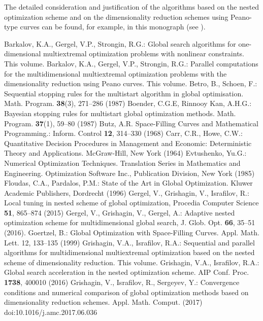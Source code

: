 The detailed consideration and justification of the algorithms based on the nested optimization scheme and on the dimensionality reduction schemes using Peano-type curves can be found, for example, in this monograph (see \cite{1_BarGerStrChap6, 1_GriIsrChap5}). 
% 
\begin{thebibliography}{99.}
 Barkalov, K.A., Gergel, V.P., Strongin, R.G.: Global search algorithms for one-dimensional multiextremal optimization problems with nonlinear constraints. This volume.
 Barkalov, K.A., Gergel, V.P., Strongin, R.G.: Parallel computations for the multidimensional multiextremal optimization problems with the dimensionality reduction using Peano curves. This volume.
 Betro, B., Schoen, F.: Sequential stopping rules for the multistart algorithm in global optimisation. Math. Program. \textbf{38}(3), 271--286 (1987)
	Boender, C.G.E, Rinnooy Kan, A.H.G.: Bayesian stopping rules for multistart global optimization methods. Math. Program. \textbf{37}(1), 59--80 (1987)
	Butz, A.R. Space-Filling Curves and Mathematical Programming.: Inform. Control \textbf{12}, 314--330 (1968)
	Carr, C.R., Howe, C.W.: Quantitative Decision Procedures in Management and Economic: Deterministic Theory and Applications. McGraw-Hill, New York (1964)
	Evtushenko, Yu.G.: Numerical Optimization Techniques. Translation Series in Mathematics and Engineering. Optimization Software  Inc., Publication Division, New York (1985)
 Floudas, C.A., Pardalos, P.M.: State of the Art in Global Optimization. Kluwer Academic Publishers, Dordrecht (1996)
 Gergel, V.,  Grishagin, V., Israfilov, R.: Local tuning in nested scheme of global optimization, Procedia Computer Science \textbf{51}, 865--874 (2015) 
	Gergel, V., Grishagin, V., Gergel, A.: Adaptive nested optimization scheme for multidimensional global search, J. Glob. Opt. \textbf{66}, 35–51 (2016).
	Goertzel, B.: Global Optimization with Space-Filling Curves. Appl. Math. Lett. 12, 133--135 (1999)
Grishagin, V.A., Israfilov, R.A.: Sequential and parallel algorithms for multidimensional multiextremal optimization based on the nested scheme of dimensionality
reduction. This volume.
	Grishagin, V.A., Israfilov, R.A.: Global search acceleration in the nested optimization scheme. AIP Conf. Proc. \textbf{1738}, 400010 (2016)
	Grishagin, V.,  Israfilov, R., Sergeyev, Y.: Convergence conditions and numerical comparison of global optimization methods based on dimensionality reduction schemes. Appl. Math.  Comput. (2017) doi:10.1016/j.amc.2017.06.036

\end{thebibliography}

